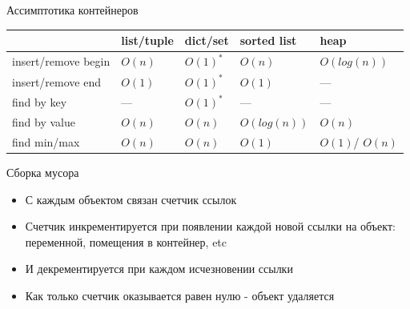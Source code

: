 \documentclass{article}
\begin{document}
\begin{center} Ассимптотика контейнеров \end{center}
\begin{center}
\begin{tabular}{ | l | l | l | l | l | }
	\hline
       & \cellcolor[gray]{0.8} list/tuple & \cellcolor[gray]{0.8} dict/set &  \cellcolor[gray]{0.8} sorted list & \cellcolor[gray]{0.8} heap \\
  	\hline
  insert/remove begin     & \cellcolor{pink} $O(n)$ & \cellcolor{green} $O(1)^*$ & \cellcolor{pink} $O(n)$ & \cellcolor{Aquamarine} $O(log(n))$ \\
  	\hline
  insert/remove end       & \cellcolor{green} $O(1)$ & \cellcolor{green} $O(1)^*$ & \cellcolor{green} $O(1)$ & ---  \\
  	\hline
  find by key      &  --- & \cellcolor{green} $O(1)^*$ & --- & --- \\
  	\hline
  find by value     &  \cellcolor{pink} $O(n)$ & \cellcolor{pink} $O(n)$ & \cellcolor{Aquamarine} $O(log(n))$ & \cellcolor{pink} $O(n)$ \\
  	\hline
  find min/max     &  \cellcolor{pink} $O(n)$ & \cellcolor{pink} $O(n)$ & \cellcolor{green} $O(1)$ & \cellcolor{green} $O(1)$/\cellcolor{pink} $O(n)$ \\
  	\hline

\end{tabular}
\end{center}
\newpage

\begin{center} Сборка мусора \end{center}
\begin{itemize}
	\item С каждым объектом связан счетчик ссылок
	\item Счетчик инкрементируется при появлении каждой новой ссылки на объект:
	       переменной, помещения в контейнер, etc
	\item И декрементируется при каждом исчезновении ссылки
	\item Как только счетчик оказывается равен нулю - объект удаляется
\end{itemize}
\newpage
\end{document}
